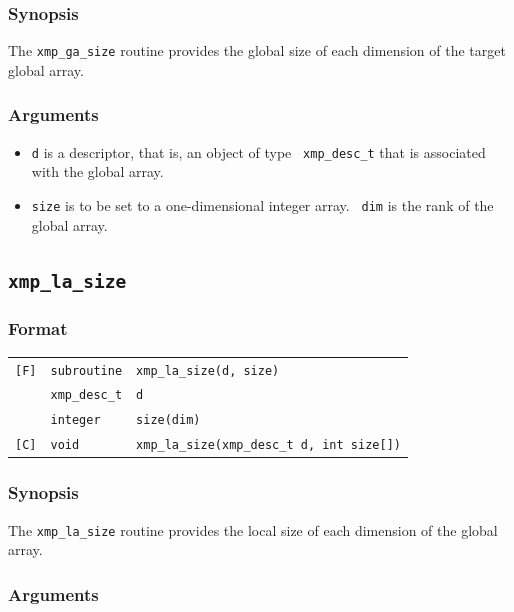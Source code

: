 \subsubsection*{Synopsis}

The {\tt xmp\_ga\_size} routine provides the global size of each
dimension of the target global array.

\subsubsection*{Arguments}

\begin{itemize}
 \item {\tt d} is a descriptor, that is, an object of type {\tt
       xmp\_desc\_t} that is associated with the global array.
 \item {\tt size} is to be set to a one-dimensional integer array. {\tt
       dim} is the rank of the global array.
\end{itemize}

\subsection{\tt xmp\_la\_size}

\subsubsection*{Format}

\begin{tabular}{lll}

\verb![F]!& {\tt subroutine}& {\tt xmp\_la\_size(d, size)}\\
          & {\tt xmp\_desc\_t} & {\tt d}\\
          & {\tt integer} & {\tt size(dim)}\\

\verb![C]!&  {\tt void}& {\tt xmp\_la\_size(xmp\_desc\_t d, int size[])}\\

\end{tabular}

\subsubsection*{Synopsis}

The {\tt xmp\_la\_size} routine provides the local size of each
dimension of the global array.

\subsubsection*{Arguments}

